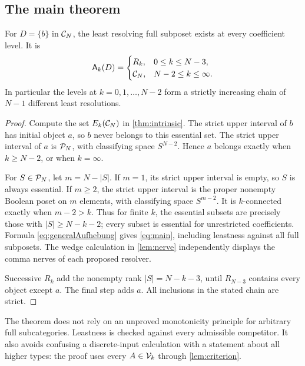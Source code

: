 \subsection{The main theorem}

\begin{theorem}\label{thm:main}
For $D=\{b\}$ in $\mathcal C_N$, the least resolving full subposet exists at
every coefficient level. It is
\begin{equation}\label{eq:main}
\mathsf A_k(D)=
\begin{cases}
R_k,&0\leq k\leq N-3,\\
\mathcal C_N,&N-2\leq k\leq\infty.
\end{cases}
\end{equation}
In particular the levels at $k=0,1,\ldots,N-2$ form a strictly increasing
chain of $N-1$ different least resolutions.
\end{theorem}

\begin{proof}
Compute the set $E_k(\mathcal C_N)$ in \cref{thm:intrinsic}.
The strict upper interval of $b$ has initial object $a$, so $b$ never
belongs to this essential set. The strict upper interval of $a$ is
$\mathcal P_N$, with classifying space $S^{N-2}$. Hence $a$ belongs
exactly when $k\geq N-2$, or when $k=\infty$.

For $S\in\mathcal P_N$, let $m=N-|S|$. If $m=1$, its strict upper
interval is empty, so $S$ is always essential. If $m\geq2$, the
strict upper interval is the proper nonempty Boolean poset on $m$
elements, with classifying space $S^{m-2}$. It is $k$-connected
exactly when $m-2>k$. Thus for finite $k$, the essential subsets are
precisely those with $|S|\geq N-k-2$; every subset is essential for
unrestricted coefficients. Formula \eqref{eq:generalAufhebung} gives
\eqref{eq:main}, including leastness against all full subposets.
The wedge calculation in \cref{lem:nerve} independently displays the
comma nerves of each proposed resolver.

Successive $R_k$ add the nonempty rank $|S|=N-k-3$, until
$R_{N-3}$ contains every object except $a$. The final step adds $a$.
All inclusions in the stated chain are strict.
\end{proof}

The theorem does not rely on an unproved monotonicity principle for arbitrary
full subcategories. Leastness is checked against every admissible competitor.
It also avoids confusing a discrete-input calculation with a statement about
all higher types: the proof uses every $A\in\mathcal V_k$ through
\cref{lem:criterion}.

